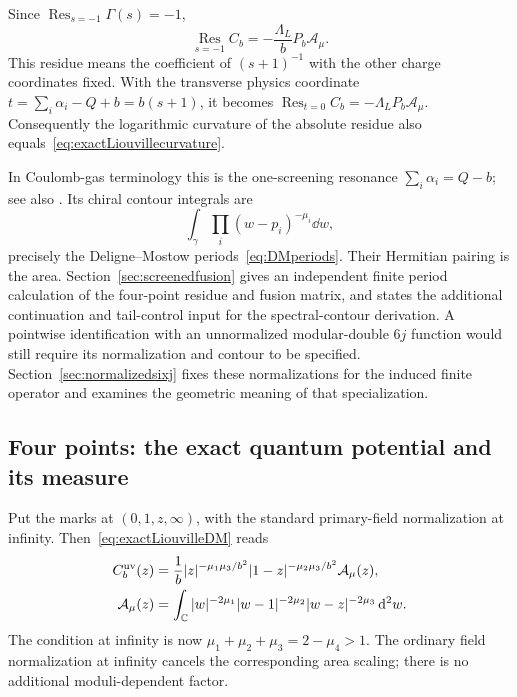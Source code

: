 Since $\operatorname{Res}_{s=-1}\Gamma(s)=-1$,
\begin{equation}
 \operatorname*{Res}_{s=-1}C_b
      =-\frac{\Lambda_L}{b}P_b\mathcal A_\mu.
 \label{eq:onescreeningresidue}
\end{equation}
This residue means the coefficient of $(s+1)^{-1}$ with the
other charge coordinates fixed. With the transverse physics
coordinate $t=\sum_i\alpha_i-Q+b=b(s+1)$, it becomes
$\operatorname{Res}_{t=0}C_b=-\Lambda_LP_b\mathcal A_\mu$.
Consequently the logarithmic curvature of the absolute residue
also equals~\eqref{eq:exactLiouvillecurvature}.

In Coulomb-gas terminology this is the one-screening resonance
$\sum_i\alpha_i=Q-b$; see also
\cite[Section~3.4]{TeschnerRevisited}. Its chiral contour integrals are
\begin{equation}
 \int_\gamma\prod_i(w-p_i)^{-\mu_i}\dd w,
 \label{eq:screeningDMperiods}
\end{equation}
precisely the Deligne--Mostow periods~\eqref{eq:DMperiods}.
Their Hermitian pairing is the area. Section~\ref{sec:screenedfusion}
gives an independent finite period calculation of the four-point
residue and fusion matrix, and states the additional continuation
and tail-control input for the spectral-contour derivation. A pointwise
identification with an unnormalized modular-double $6j$ function
would still require its normalization and contour to be specified.
Section~\ref{sec:normalizedsixj} fixes these normalizations
for the induced finite operator and examines the geometric
meaning of that specialization.

\subsection{Four points: the exact quantum potential and its measure}

Put the marks at $(0,1,z,\infty)$, with the standard primary-field
normalization at infinity. Then~\eqref{eq:exactLiouvilleDM} reads
\begin{align}
 C_b^{\mathrm{uv}}(z)
   &=\frac1b |z|^{-\mu_1\mu_3/b^2}
              |1-z|^{-\mu_2\mu_3/b^2}\mathcal A_\mu(z),
              \label{eq:fourpointLiouville}\\
 \mathcal A_\mu(z)
   &=\int_{\mathbb C}|w|^{-2\mu_1}|w-1|^{-2\mu_2}
                         |w-z|^{-2\mu_3}\mathop{}\!\mathrm d^2w.\notag
\end{align}
The condition at infinity is now
$\mu_1+\mu_2+\mu_3=2-\mu_4>1$. The ordinary field
normalization at infinity cancels the corresponding area scaling;
there is no additional moduli-dependent factor.

